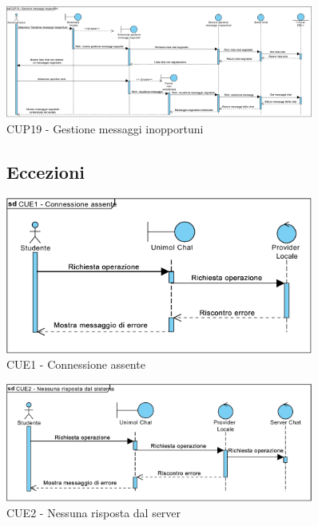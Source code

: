 \begin{figure}
	\centering
	\includegraphics[width=0.9\textwidth]{imgs/gruppo6/sequence/CUP19_gestione_messaggi_inopportuni.pdf}
	\caption{CUP19 - Gestione messaggi inopportuni}
	\label{fig:seq-cup19}
\end{figure}

\pagebreak

\begin{figure}[!h]
	\subsection{Eccezioni}
	\centering
	\includegraphics[width=0.9\textwidth]{imgs/gruppo6/sequence/CUE1_connessione_assente.pdf}
	\caption{CUE1 - Connessione assente}
	\label{fig:seq-cue1}
\end{figure}


\begin{figure}
	\centering
	\includegraphics[width=0.9\textwidth]{imgs/gruppo6/sequence/CUE2_nessuna_risposta_dal_server.pdf}
	\caption{CUE2 - Nessuna risposta dal server}
	\label{fig:seq-cue2}
\end{figure}

